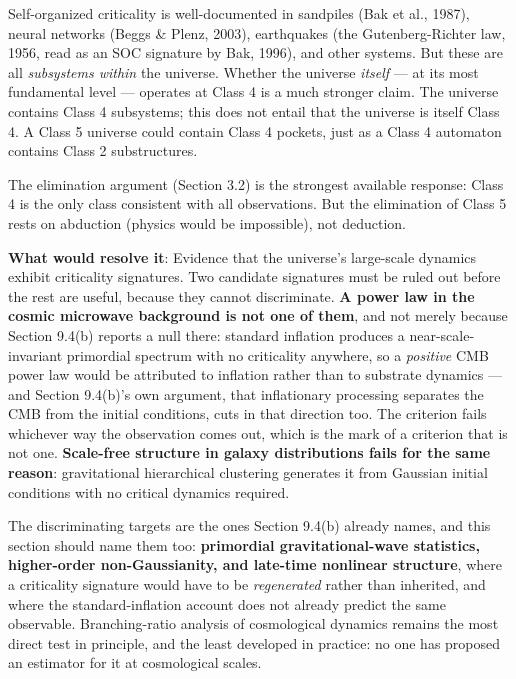 \documentclass[
]{article}
\begin{document}
Self-organized criticality is well-documented in sandpiles (Bak et al.,
1987), neural networks (Beggs \& Plenz, 2003), earthquakes (the
Gutenberg-Richter law, 1956, read as an SOC signature by Bak, 1996), and
other systems. But these are all \emph{subsystems within} the universe.
Whether the universe \emph{itself} --- at its most fundamental level ---
operates at Class 4 is a much stronger claim. The universe contains
Class 4 subsystems; this does not entail that the universe is itself
Class 4. A Class 5 universe could contain Class 4 pockets, just as a
Class 4 automaton contains Class 2 substructures.

The elimination argument (Section 3.2) is the strongest available
response: Class 4 is the only class consistent with all observations.
But the elimination of Class 5 rests on abduction (physics would be
impossible), not deduction.

\textbf{What would resolve it}: Evidence that the universe's large-scale
dynamics exhibit criticality signatures. Two candidate signatures must
be ruled out before the rest are useful, because they cannot
discriminate. \textbf{A power law in the cosmic microwave background is
not one of them}, and not merely because Section 9.4(b) reports a null
there: standard inflation produces a near-scale-invariant primordial
spectrum with no criticality anywhere, so a \emph{positive} CMB power
law would be attributed to inflation rather than to substrate dynamics
--- and Section 9.4(b)'s own argument, that inflationary processing
separates the CMB from the initial conditions, cuts in that direction
too. The criterion fails whichever way the observation comes out, which
is the mark of a criterion that is not one. \textbf{Scale-free structure
in galaxy distributions fails for the same reason}: gravitational
hierarchical clustering generates it from Gaussian initial conditions
with no critical dynamics required.

The discriminating targets are the ones Section 9.4(b) already names,
and this section should name them too: \textbf{primordial
gravitational-wave statistics, higher-order non-Gaussianity, and
late-time nonlinear structure}, where a criticality signature would have
to be \emph{regenerated} rather than inherited, and where the
standard-inflation account does not already predict the same observable.
Branching-ratio analysis of cosmological dynamics remains the most
direct test in principle, and the least developed in practice: no one
has proposed an estimator for it at cosmological scales.
\end{document}
